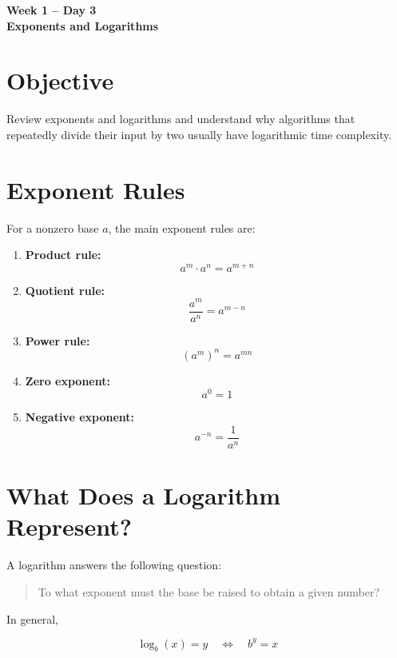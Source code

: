 \documentclass[12pt, a4paper]{article}
\begin{document}
\begin{center}
    {\LARGE\color{titleblue}\textbf{Week 1 -- Day 3}}\\[0.3em]
    {\LARGE\textbf{Exponents and Logarithms}}
\end{center}

\section*{Objective}

Review exponents and logarithms and understand why algorithms that repeatedly divide their input by two usually have 
logarithmic time complexity.

\section*{Exponent Rules}
For a nonzero base $a$, the main exponent rules are: 

\begin{enumerate}[label=\textbf{\arabic*.}, leftmargin=*]
    \item \textbf{Product rule:}
    \[
        a^m \cdot a^n = a^{m+n}
    \]

    \item \textbf{Quotient rule:}
    \[
        \frac{a^m}{a^n} = a^{m-n}
    \]

    \item \textbf{Power rule:}
    \[
        \left(a^m\right)^n = a^{mn}
    \]

    \item \textbf{Zero exponent:}
    \[
        a^0 = 1
    \]
    
    \item \textbf{Negative exponent:}
    \[
        a^{-n} = \frac{1}{a^n}
    \]

\end{enumerate}

\section*{What Does a Logarithm Represent?}

A logarithm answers the following question:

\begin{quote}
    To what exponent must the base be raised to obtain a given number?
\end{quote}

In general, 

\[
    \log_b(x) = y \quad\Longleftrightarrow\quad b^y = x
\]
\end{document}
